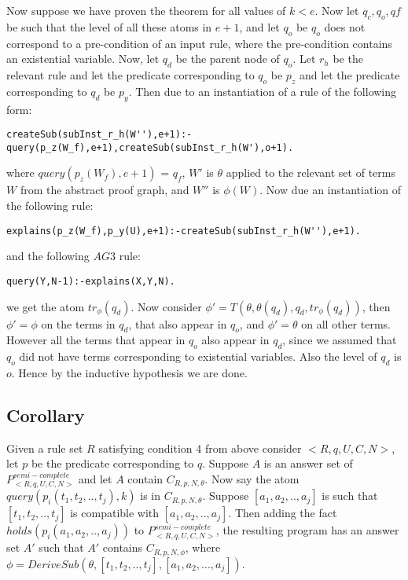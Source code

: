 \documentclass{article}
\begin{document}
Now suppose we have proven the theorem for all values of $k<e$. Now let $q_{c},q_{o},q{f}$ be such that the level of all these atoms in $e+1$, and let $q_{o}$ be $q_{o}$ does not correspond to a pre-condition of an input rule, where the pre-condition contains an existential variable. Now, let $q_{d}$ be the parent node of $q_{o}$. Let $r_{h}$ be the relevant rule and let the predicate corresponding to $q_{o}$ be $p_{z}$ and let the predicate corresponding to $q_{d}$ be $p_{y}$. Then due to an instantiation of a rule of the following form:
\begin{verbatim}
createSub(subInst_r_h(W''),e+1):-query(p_z(W_f),e+1),createSub(subInst_r_h(W'),o+1).
\end{verbatim}
where $query(p_{z}(W_{f}),e+1)$ = $q_{f}$, $W'$ is $\theta$ applied to the relevant set of terms $W$ from the abstract proof graph, and $W''$ is $\phi(W)$. Now due an instantiation of the following rule:
\begin{verbatim}
explains(p_z(W_f),p_y(U),e+1):-createSub(subInst_r_h(W''),e+1).
\end{verbatim} and the following $AG3$ rule:
\begin{verbatim}
query(Y,N-1):-explains(X,Y,N).    
\end{verbatim}
we get the atom $tr_{\phi}(q_{d})$. Now consider $\phi'= T(\theta, \theta(q_{d}), q_{d}, tr_{\phi}(q_{d}))$, then $\phi'=\phi$ on the terms in $q_{d}$, that also appear in $q_{o}$, and $\phi' = \theta$ on all other terms. However all the terms that appear in $q_{o}$ also appear in $q_{d}$, since we assumed that $q_{o}$ did not have terms corresponding to existential variables. Also the level of $q_{d}$ is $o$. Hence by the inductive hypothesis we are done.




 
\subsection{Corollary}
Given a rule set $R$ satisfying condition 4 from above consider $<R,q,U,C,N>$, let $p$ be the predicate corresponding to $q$. Suppose $A$ is an answer set of $P^{semi-complete}_{<R,q,U,C,N>}$ and let $A$ contain $C_{R,p,N,\theta}$. Now say the atom $query(p_{i}(t_{1},t_{2},..,t_{j}),k)$ is in $C_{R,p,N,\theta}$. Suppose $[a_{1},a_{2},..,a_{j}]$ is such that $[t_{1},t_{2},..,t_{j}]$ is compatible with $[a_{1},a_{2},..,a_{j}]$. Then adding the fact $holds(p_{i}(a_{1},a_{2},..,a_{j}))$ to $P^{semi-complete}_{<R,q,U,C,N>}$, the resulting program has an answer set $A'$ such that $A'$ contains $C_{R,p,N,\phi}$, where $\phi = DeriveSub(\theta, [t_{1},t_{2},..,t_{j}],[a_{1},a_{2},...,a_{j}])$. 
\end{document}

